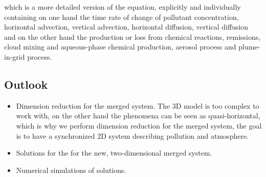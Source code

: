 \documentclass{article}
\begin{document}
which is a more detailed version of the equation, explicitly and individually containing on one hand the time rate of change of pollutant concentration, horizontal advection, vertical advection, horizontal diffusion, vertical diffusion and on the other hand the production or loss from chemical reactions, remissions, cloud mixing and aqueous-phase chemical production, aerosol process and plume-in-grid process.

\subsection{Outlook}

\begin{itemize}
  \item Dimension reduction for the merged system. The 3D model is too complex to work with, on the other hand the phenomena can be seen as quasi-horizontal, which is why we perform dimension reduction for the merged system, the goal is to have a synchronized 2D system describing pollution and atmosphere.
  \item Solutions for the for the new, two-dimensional merged system.
  \item Numerical simulations of solutions.
\end{itemize}

\nocite{*}


\end{document}

